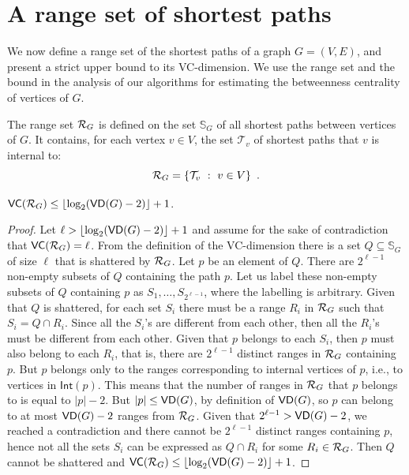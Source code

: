 \section{A range set of shortest paths}\label{sec:rangeset}
We now define a range set of the shortest paths of a graph $G=(V,E)$, and present 
a strict upper bound to its VC-dimension. %
We use the range set and the bound in the analysis of our algorithms for estimating
the betweenness centrality of vertices of $G$.

The range set $\mathcal{R}_G$ is defined on the set $\mathbb{S}_G$ of all shortest
paths between vertices of $G$. It contains, for each vertex $v\in V$, the set
$\mathcal{T}_v$ of shortest paths that $v$ is internal to:
\[
\mathcal{R}_G = \{\mathcal{T}_v ~:~ v\in V\}\enspace.
\]

\begin{lemma}\label{lem:vcdimuppbound}
  $\mathsf{VC}(\mathcal{R}_G)\le\lfloor\log_2(\mathsf{VD}(G)-2)\rfloor+1$.
\end{lemma}

\begin{proof}
Let $\ell>\lfloor\log_2(\mathsf{VD}(G)-2)\rfloor+1$ and assume for the sake of contradiction
that $\mathsf{VC}(\mathcal{R}_G)=\ell$. From the definition of the VC-dimension there is a set
$Q\subseteq\mathbb{S}_G$ of size $\ell$ that is shattered by $\mathcal{R}_G$. Let $p$ be
an element of $Q$. There are  $2^{\ell-1}$ non-empty subsets of
$Q$ containing the path $p$. Let us label these non-empty subsets of $Q$ containing $p$ as
$S_1,\dotsc,S_{2^{\ell-1}}$, where the labelling is arbitrary.
Given that $Q$ is shattered, for each set $S_i$ there must be a range $R_i$ in
$\mathcal{R}_G$ such that $S_i=Q\cap R_i$. Since all the $S_i$'s are
different from each other, then all the $R_i$'s must be different from each
other. Given that $p$ belongs to each $S_i$, then $p$ must also belong to each
$R_i$, that is, there are $2^{\ell-1}$ distinct ranges in $\mathcal{R}_G$ containing
$p$. But $p$ belongs only to the ranges corresponding to internal vertices of
$p$, i.e., to vertices in $\mathsf{Int}(p)$. This means that the number of ranges
in $\mathcal{R}_G$ that $p$ belongs to is equal to $|p|-2$. But $|p|\le\mathsf{VD}(G)$, by
definition of $\mathsf{VD}(G)$, so $p$
can belong to at most $\mathsf{VD}(G)-2$ ranges from $\mathcal{R}_G$. Given that
$2^{\ell-1}>\mathsf{VD}(G)-2$, we reached a contradiction and there cannot be $2^{\ell-1}$
distinct ranges containing $p$, hence not all the sets $S_i$ can be expressed as
$Q\cap R_i$ for some $R_i\in\mathcal{R}_G$. Then $Q$ cannot be shattered and
$\mathsf{VC}(\mathcal{R}_G)\le\lfloor\log_2(\mathsf{VD}(G)-2)\rfloor+1$.%
\end{proof}


